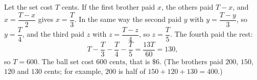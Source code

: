 Let the set cost $T$ cents. If the first brother paid $x$, the others paid $T-x$, and $x=\dfrac{T-x}{2}$ gives $x=\dfrac {T}{3}$. In the same way the second paid $y$ with $y=\dfrac{T-y}{3}$, so $y=\dfrac {T}{4}$, and the third paid $z$ with $z=\dfrac{T-z}{4}$, so $z=\dfrac {T}{5}$. The fourth paid the rest:
\[
T-\dfrac {T}{3}-\dfrac {T}{4}-\dfrac {T}{5}=\dfrac{13T}{60}=130 ,
\]
so $T=600$. The ball set cost $\boxed{600\text{ cents}}$, that is $\$6$. (The brothers paid $200$, $150$, $120$ and $130$ cents; for example, $200$ is half of $150+120+130=400$.)
